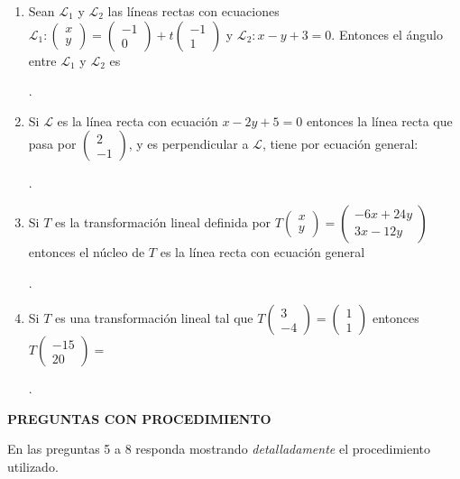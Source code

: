 \documentclass[11pt]{article}
\newcommand{\ptsbox}[1]{\fboxsep=3pt\fbox{\footnotesize #1}\hspace{4pt}}
\newcommand{\vect}[2]{\begin{pmatrix}#1\\#2\end{pmatrix}}
\begin{document}
\begin{enumerate}

\item \ptsbox{7\%} Sean $\mathcal{L}_1$ y $\mathcal{L}_2$ las líneas rectas con ecuaciones $\mathcal{L}_1: \vect{x}{y} = \vect{-1}{0} + t\vect{-1}{1}$ y $\mathcal{L}_2: x-y+3=0$. Entonces el ángulo entre $\mathcal{L}_1$ y $\mathcal{L}_2$ es

\vspace{50pt}
\underline{\hspace{6cm}}.

\item \ptsbox{7\%} Si $\mathcal{L}$ es la línea recta con ecuación $x-2y+5=0$ entonces la línea recta que pasa por $\vect{2}{-1}$, y es perpendicular a $\mathcal{L}$, tiene por ecuación general:

\vspace{60pt}
\underline{\hspace{6cm}}.

\item \ptsbox{8\%} Si $T$ es la transformación lineal definida por $T\vect{x}{y} = \vect{-6x+24y}{3x-12y}$ entonces el núcleo de $T$ es la línea recta con ecuación general

\vspace{80pt}
\underline{\hspace{6cm}}.

\item \ptsbox{8\%} Si $T$ es una transformación lineal tal que $T\vect{3}{-4} = \vect{1}{1}$ entonces $T\vect{-15}{20} = $

\vspace{80pt}
\underline{\hspace{6cm}}.

\end{enumerate}

\vspace{10pt}
\noindent\textbf{PREGUNTAS CON PROCEDIMIENTO}

\noindent En las preguntas 5 a 8 responda mostrando \emph{detalladamente} el procedimiento utilizado.
\end{document}
